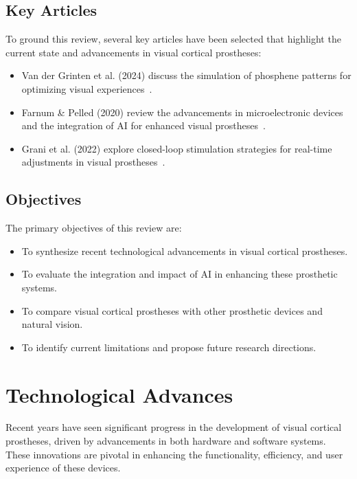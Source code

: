 \documentclass[twocolumn,10pt]{article}
\begin{document}
\subsection*{Key Articles}\label{sec:key_articles}
To ground this review, several key articles have been selected that highlight
the current state and advancements in visual cortical prostheses:
\begin{itemize}
      \item Van der Grinten et al. (2024) discuss the simulation of phosphene
            patterns for optimizing visual
            experiences~\parencite{vandergrintenBiologicallyPlausiblePhosphene2024a}.
      \item Farnum \& Pelled (2020) review the advancements in microelectronic
            devices and the integration of AI for enhanced visual
            prostheses~\parencite{farnumNewVisionVisual2020}.
      \item Grani et al. (2022) explore closed-loop stimulation strategies for
            real-time adjustments in visual
            prostheses~\parencite{graniPersonalizedClosedloopStimulation2022}.
\end{itemize}

\subsection*{Objectives}\label{sec:objectives}
The primary objectives of this review are:
\begin{itemize}
      \item To synthesize recent technological advancements in visual cortical
            prostheses.
      \item To evaluate the integration and impact of AI in enhancing these
            prosthetic systems.
      \item To compare visual cortical prostheses with other prosthetic devices
            and natural vision.
      \item To identify current limitations and propose future research
            directions.
\end{itemize}

\section*{Technological Advances}\label{sec:tech_advances}
Recent years have seen significant progress in the development of visual
cortical prostheses, driven by advancements in both hardware and software
systems. These innovations are pivotal in enhancing the functionality,
efficiency, and user experience of these devices.
\end{document}
